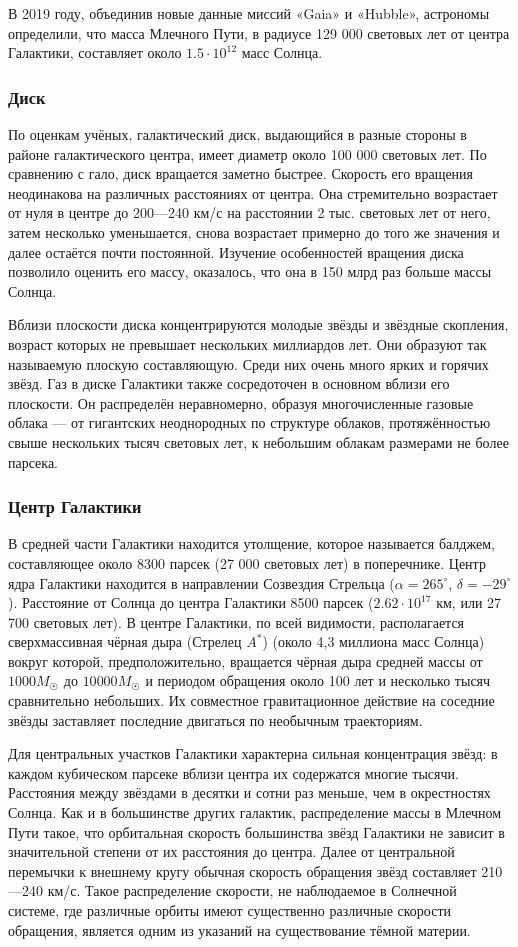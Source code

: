 В 2019 году, объединив новые данные миссий «Gaia» и «Hubble», астрономы определили, что масса Млечного Пути, в радиусе 129 000 световых лет от центра Галактики, составляет около $1.5\cdot10^{12}$ масс Солнца.
\subsubsection{Диск}
По оценкам учёных, галактический диск, выдающийся в разные стороны в районе галактического центра, имеет диаметр около 100 000 световых лет. По сравнению с гало, диск вращается заметно быстрее. Скорость его вращения неодинакова на различных расстояниях от центра. Она стремительно возрастает от нуля в центре до 200—240 км/с на расстоянии 2 тыс. световых лет от него, затем несколько уменьшается, снова возрастает примерно до того же значения и далее остаётся почти постоянной. Изучение особенностей вращения диска позволило оценить его массу, оказалось, что она в 150 млрд раз больше массы Солнца.

Вблизи плоскости диска концентрируются молодые звёзды и звёздные скопления, возраст которых не превышает нескольких миллиардов лет. Они образуют так называемую плоскую составляющую. Среди них очень много ярких и горячих звёзд. Газ в диске Галактики также сосредоточен в основном вблизи его плоскости. Он распределён неравномерно, образуя многочисленные газовые облака — от гигантских неоднородных по структуре облаков, протяжённостью свыше нескольких тысяч световых лет, к небольшим облакам размерами не более парсека.
\subsubsection{Центр Галактики}
В средней части Галактики находится утолщение, которое называется балджем, составляющее около 8300 парсек (27 000 световых лет) в поперечнике. Центр ядра Галактики находится в направлении Созвездия Стрельца ($\alpha = 265^{\circ}$, $\delta = - 29^{\circ}$). Расстояние от Солнца до центра Галактики 8500 парсек ($2.62\cdot10^{17}$ км, или 27 700 световых лет). В центре Галактики, по всей видимости, располагается сверхмассивная чёрная дыра (Стрелец $A^{*}$) (около 4,3 миллиона масс Солнца) вокруг которой, предположительно, вращается чёрная дыра средней массы от $1000M_{\Sun}$ до $10 000M_{\Sun}$ и периодом обращения около 100 лет и несколько тысяч сравнительно небольших. Их совместное гравитационное действие на соседние звёзды заставляет последние двигаться по необычным траекториям.

Для центральных участков Галактики характерна сильная концентрация звёзд: в каждом кубическом парсеке вблизи центра их содержатся многие тысячи. Расстояния между звёздами в десятки и сотни раз меньше, чем в окрестностях Солнца. Как и в большинстве других галактик, распределение массы в Млечном Пути такое, что орбитальная скорость большинства звёзд Галактики не зависит в значительной степени от их расстояния до центра. Далее от центральной перемычки к внешнему кругу обычная скорость обращения звёзд составляет 210—240 км/с. Такое распределение скорости, не наблюдаемое в Солнечной системе, где различные орбиты имеют существенно различные скорости обращения, является одним из указаний на существование тёмной материи.

